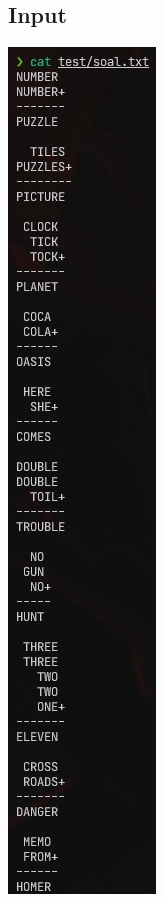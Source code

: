 \documentclass{article}
\let\origfigure\figure
\let\endorigfigure\endfigure
\renewenvironment{figure}[1][2] {
    \expandafter\origfigure\expandafter[H]
} {
    \endorigfigure
}
\begin{document}
\subsection{Input}
\begin{figure}
  \includegraphics{stima-ss-3.png}
  \caption{Masukan program (10 soal)}
\end{figure}
\end{document}
